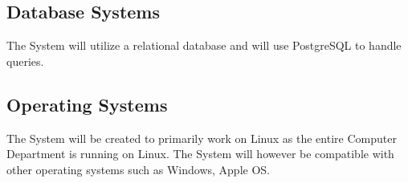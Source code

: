 \documentclass[12pt, letterpaper, twoside]{article}
\begin{document}
	
	\subsection{Database Systems}
		The System will utilize a relational database and will use PostgreSQL to handle queries.
		
	\subsection{Operating Systems}
		The System will be created to primarily work on Linux as the entire Computer Department is running on Linux. The System will however be compatible with other operating systems such as Windows, Apple OS.
\end{document}
